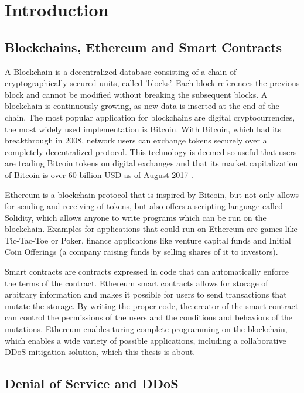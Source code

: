 \chapter{Introduction}

\section{Blockchains, Ethereum and Smart Contracts}

A Blockchain is a decentralized database consisting of a chain of cryptographically secured units, called 'blocks'. Each block references the previous block and cannot be modified without breaking the subsequent blocks. A blockchain is continuously growing, as new data is inserted at the end of the chain.
The most popular application for blockchains are digital cryptocurrencies, the most widely used implementation is Bitcoin. With Bitcoin, which had its breakthrough in 2008, network users can exchange tokens securely over a completely decentralized protocol. This technology is deemed so useful that users are trading Bitcoin tokens on digital exchanges and that its market capitalization of Bitcoin is over 60 billion USD as of August 2017 \cite{BitcoinMarketCap}.
 
Ethereum \cite{Ethereum} is a blockchain protocol that is inspired by Bitcoin, but not only allows for sending and receiving of tokens, but also offers a scripting language called Solidity, which allows anyone to write programs which can be run on the blockchain. Examples for applications that could run on Ethereum are games like Tic-Tac-Toe or Poker, finance applications like venture capital funds and Initial Coin Offerings (a company raising funds by selling shares of it to investors).

Smart contracts are contracts expressed in code that can automatically enforce the terms of the contract. Ethereum smart contracts allows for storage of arbitrary information and makes it possible for users to send transactions that mutate the storage. By writing the proper code, the creator of the smart contract can control the permissions of the users and the conditions and behaviors of the mutations. Ethereum enables turing-complete programming on the blockchain, which enables a wide variety of possible applications, including a collaborative DDoS mitigation solution, which this thesis is about.

\section{Denial of Service and DDoS}

